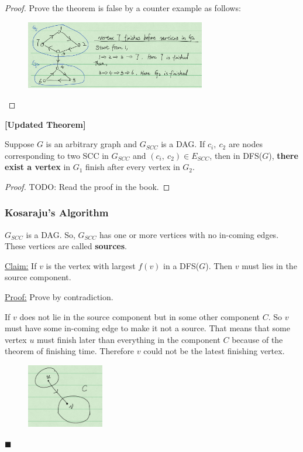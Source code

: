 \documentclass[en,hazy,blue,normal,12pt]{elegantnote}
\newenvironment{claim}[1]{\par\noindent\underline{Claim:}\space#1}{}
\newenvironment{claimproof}[1]{\par\noindent\underline{Proof:}\space#1}{\hfill $\blacksquare$}
\begin{document}
\begin{proof}
 Prove the theorem is false by a counter example as follows:
\begin{figure}[H]
\centering
\includegraphics[width=0.7\textwidth]{scc-finish-time.png}
\end{figure}
\end{proof}

\begin{theorem}\textbf{[Updated Theorem]}

Suppose $G$ is an arbitrary graph and $G_{SCC}$ is a DAG. If $c_i, ~c_2$ are 
nodes corresponding to two SCC in $G_{SCC}$ and $(c_i, ~c_2) \in E_{SCC}$, then 
in DFS($G$), \textbf{there exist a vertex} in $G_1$ finish after every vertex 
in $G_2$. 
\end{theorem}

\begin{proof}
 TODO: Read the proof in the book.
\end{proof}

\subsubsection{Kosaraju's Algorithm}
\begin{definition}
$G_{SCC}$ is a DAG. So, $G_{SCC}$ has one or more vertices with no in-coming 
edges. These vertices are called \textbf{sources}.
\end{definition}

\begin{claim}{}
If $v$ is the vertex with largest $f(v)$ in a DFS($G$). Then $v$ must lies in 
the source component. 
\end{claim}

\begin{claimproof}{}
Prove by contradiction.

If $v$ does not lie in the source component but in some other component $C$. So 
$v$ must have some in-coming edge to make it not a source. That means that 
some vertex $u$ must finish later than everything in the component $C$ because 
of the theorem of finishing time. Therefore $v$ could not be the latest 
finishing vertex.
\begin{figure}[H]
\centering
\includegraphics[width=0.3\textwidth]{source-finish-time.png}
\end{figure}
\end{claimproof}
\end{document}
